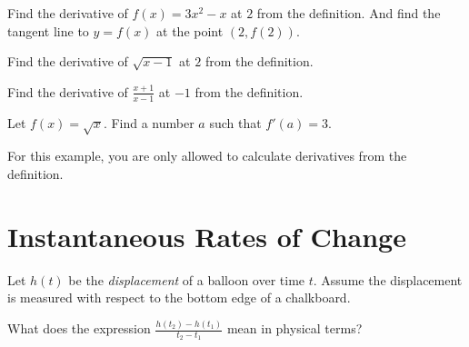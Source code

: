 \documentclass[../main.tex]{subfiles}
\begin{document}
\bigskip
\begin{example}
  Find the derivative of \(f(x) = 3x^{2} - x\) at \(2\) from the definition. And find the tangent line to \(y = f(x)\) at the point \((2, f(2))\).
\end{example}
\clearpage
\begin{example}
  Find the derivative of \(\sqrt{x - 1}\) at \(2\) from the definition.
\end{example}
\vspace{2in}

\begin{example}
  Find the derivative of \(\frac{x + 1}{x - 1}\) at \(-1\) from the definition.
\end{example}
\vspace{3in}

\begin{example}
  Let \(f(x) = \sqrt{x}\). Find a number \(a\) such that \(f'(a) = 3\). 

  For this example, you are only allowed to calculate derivatives from the definition.
\end{example}
\clearpage

\section{Instantaneous Rates of Change}
\begin{example}
  Let \(h(t)\) be the \emph{displacement} of a balloon over time \(t\). Assume the displacement is measured with respect to the bottom edge of a chalkboard.

  What does the expression \(\frac{h(t_{2}) - h(t_{1})}{t_{2} - t_{1}}\) mean in physical terms?
  \vfill

\end{example}
\end{document}
